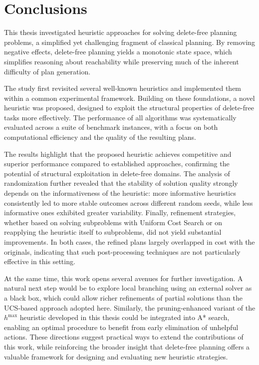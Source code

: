 \chapter{Conclusions}
This thesis investigated heuristic approaches for solving delete-free planning problems, a simplified yet challenging fragment of classical planning.
By removing negative effects, delete-free planning yields a monotonic state space, which simplifies reasoning about reachability while preserving
much of the inherent difficulty of plan generation.

The study first revisited several well-known heuristics and implemented them within a common experimental framework. Building on these foundations,
a novel heuristic was proposed, designed to exploit the structural properties of delete-free tasks more effectively. The performance of all algorithms
was systematically evaluated across a suite of benchmark instances, with a focus on both computational efficiency and the quality of the resulting plans.

The results highlight that the proposed heuristic achieves competitive and superior performance compared to established approaches,
confirming the potential of structural exploitation in delete-free domains. The analysis of randomization further revealed that the stability of solution
quality strongly depends on the informativeness of the heuristic: more informative heuristics consistently led to more stable outcomes across different
random seeds, while less informative ones exhibited greater variability. Finally, refinement strategies, whether based on solving subproblems with
Uniform Cost Search or on reapplying the heuristic itself to subproblems, did not yield substantial improvements. In both cases,
the refined plans largely overlapped in cost with the originals, indicating that such post-processing techniques are not particularly effective in this setting.

At the same time, this work opens several avenues for further investigation. A natural next step would be to explore local branching using an external
solver as a black box, which could allow richer refinements of partial solutions than the \textsc{UCS}-based approach adopted here.
Similarly, the pruning-enhanced variant of the $h^{\max}$ heuristic developed in this thesis could be integrated into \textsc{A*} search, enabling an optimal procedure
to benefit from early elimination of unhelpful actions. These directions suggest practical ways to extend the contributions of this work,
while reinforcing the broader insight that delete-free planning offers a valuable framework for designing and evaluating new heuristic strategies.
